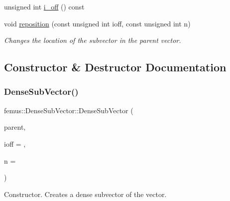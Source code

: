 \begin{DoxyCompactItemize}
\item 
unsigned int \mbox{\hyperlink{classfemus_1_1_dense_sub_vector_afd7cee05ce11a2c32a8696386eb0b206}{i\+\_\+off}} () const
\item 
void \mbox{\hyperlink{classfemus_1_1_dense_sub_vector_afdaa52b0ba46efba781c7d7f0fe6e950}{reposition}} (const unsigned int ioff, const unsigned int n)
\begin{DoxyCompactList}\small\item\em Changes the location of the subvector in the parent vector. \end{DoxyCompactList}\end{DoxyCompactItemize}


\subsection{Constructor \& Destructor Documentation}
\mbox{\label{classfemus_1_1_dense_sub_vector_a321eb522717c8ac3d322c2d9ad367e11}} 
\subsubsection{\texorpdfstring{Dense\+Sub\+Vector()}{DenseSubVector()}}
{\footnotesize\ttfamily femus\+::\+Dense\+Sub\+Vector\+::\+Dense\+Sub\+Vector (\begin{DoxyParamCaption}\item[{\mbox{\hyperlink{classfemus_1_1_dense_vector}{Dense\+Vector}} \&}]{parent,  }\item[{const unsigned int}]{ioff = {},  }\item[{const unsigned int}]{n = {} }\end{DoxyParamCaption})\hspace{0.3cm}{\ttfamily [inline]}}



Constructor. Creates a dense subvector of the vector. 

\mbox{\label{classfemus_1_1_dense_sub_vector_ab4a41a2c3e8cf97c9e2680d9d250f115}} 
